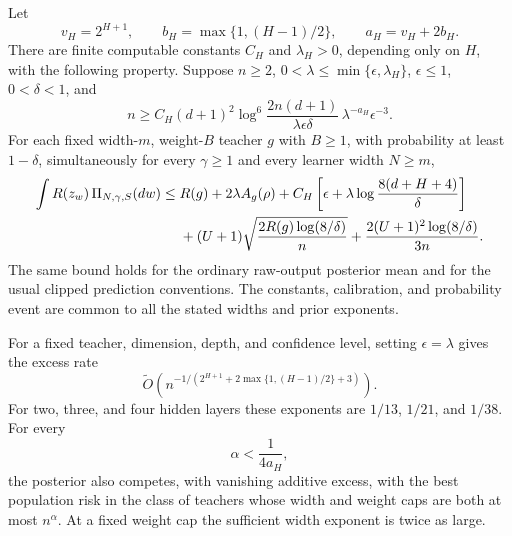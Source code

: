 \begin{theorem}
\label{thm:fixed-all-gamma-raw}
Let
\[
 v_H=2^{H+1},\qquad b_H=\max\{1,(H-1)/2\},\qquad
 a_H=v_H+2b_H.
\]
There are finite computable constants $C_H$ and $\lambda_H>0$, depending
only on $H$, with the following property.  Suppose $n\geq2$,
$0<\lambda\leq\min\{\epsilon,\lambda_H\}$, $\epsilon\leq1$,
$0<\delta<1$, and
\begin{equation}
 n\geq C_H(d+1)^2
    \log^6\!\frac{2n(d+1)}{\lambda\epsilon\delta}\,
                 \lambda^{-a_H}\epsilon^{-3}.
 \label{eq:fixed-all-gamma-budget}
\end{equation}
For each fixed width-$m$, weight-$B$ teacher $g$ with $B\geq1$, with
probability at least $1-\delta$, simultaneously for every
$\gamma\geq1$ and every learner width $N\geq m$,
\begin{align}
 \int R(z_w)\,\Pi_{N,\gamma,S}(dw)
 \leq\;&R(g)+2\lambda A_g(\rho)
            +C_H\left[\epsilon+\lambda\log\frac{8(d+H+4)}\delta\right]
 \notag\\
 &+(U+1)\sqrt{\frac{2R(g)\log(8/\delta)}n}
        +\frac{2(U+1)^2\log(8/\delta)}{3n}.
 \label{eq:fixed-all-gamma-oracle}
\end{align}
The same bound holds for the ordinary raw-output posterior mean and
for the usual clipped prediction conventions.
The constants, calibration, and probability event are common to all
the stated widths and prior exponents.

For a fixed teacher, dimension, depth, and confidence level, setting
$\epsilon=\lambda$ gives the excess rate
\begin{equation}
 \widetilde O\!\left(n^{-1/(2^{H+1}+2\max\{1,(H-1)/2\}+3)}\right).
 \label{eq:fixed-all-gamma-rate}
\end{equation}
For two, three, and four hidden layers these exponents are
$1/13$, $1/21$, and $1/38$.  For every
\begin{equation}
 \alpha<\frac1{4a_H},
 \label{eq:fixed-all-gamma-growing}
\end{equation}
the posterior also competes, with vanishing additive excess, with the
best population risk in the class of teachers whose width and weight
caps are both at most $n^\alpha$.  At a fixed weight cap the sufficient
width exponent is twice as large.
\end{theorem}

